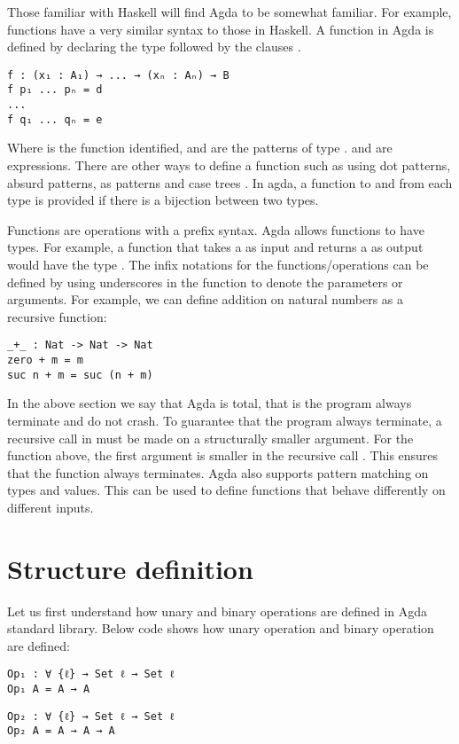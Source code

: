 Those familiar with Haskell will find Agda to be somewhat familiar. For example,
functions have a very similar syntax to those in Haskell. A function in Agda is
defined by declaring the type followed by the clauses \cite{agdaFunction}. 
\begin{verbatim}
f : (x₁ : A₁) → ... → (xₙ : Aₙ) → B
f p₁ ... pₙ = d
...
f q₁ ... qₙ = e
\end{verbatim} 
Where  is the function identified,  and  are the
patterns of type .  and  are expressions. There
are other ways to define a function such as using dot patterns, absurd patterns,
as patterns and case trees \cite{agdaFunction}. In agda, a function to and from
each type is provided if there is a bijection between two types.

Functions are operations with a prefix syntax. Agda allows functions to have
types. For example, a function that takes a  as input and returns a
 as output would have the type . The infix
notations for the functions/operations can be defined by using underscores in
the function to denote the parameters or arguments. For example, we can define
addition on natural numbers as a recursive function:
\label{code:Add}
\begin{verbatim}
_+_ : Nat -> Nat -> Nat
zero + m = m
suc n + m = suc (n + m)
\end{verbatim}

In the above section we say that Agda is total, that is the program always
terminate and do not crash. To guarantee that the program always terminate, a
recursive call in must be made on a structurally smaller argument. For the
function \inline{_+_} above, the first argument  is smaller in the
recursive call . This ensures that the function \inline{_+_}
always terminates. Agda also supports pattern matching on types and values. This
can be used to define functions that behave differently on different inputs.

\section{Structure definition}
Let us first understand how unary and binary operations are defined in Agda standard
library. Below code shows how unary operation  and binary operation
 are defined:
\begin{verbatim}
Op₁ : ∀ {ℓ} → Set ℓ → Set ℓ
Op₁ A = A → A
\end{verbatim}
\begin{verbatim}
Op₂ : ∀ {ℓ} → Set ℓ → Set ℓ
Op₂ A = A → A → A
\end{verbatim}

